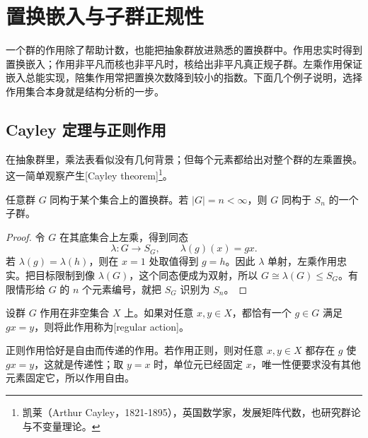 
\section{置换嵌入与子群正规性}
\label{b1:sec:0404}

一个群的作用除了帮助计数，也能把抽象群放进熟悉的置换群中。作用忠实时得到置换嵌入；作用非平凡而核也非平凡时，核给出非平凡真正规子群。左乘作用保证嵌入总能实现，陪集作用常把置换次数降到较小的指数。下面几个例子说明，选择作用集合本身就是结构分析的一步。


%
%
%

\subsection{Cayley 定理与正则作用}
\label{b1:subsec:0404:01}

在抽象群里，乘法表看似没有几何背景；但每个元素都给出对整个群的左乘置换。这一简单观察产生[Cayley theorem]\footnote{凯莱（Arthur Cayley，1821-1895），英国数学家，发展矩阵代数，也研究群论与不变量理论。}。

\begin{theorem}[Cayley]\label{b1:thm:cayley}
	任意群 \(G\) 同构于某个集合上的置换群。若 \(|G|=n<\infty\)，则 \(G\) 同构于 \(S_n\) 的一个子群。
\end{theorem}
\begin{proof}
	令 \(G\) 在其底集合上左乘，得到同态
	\[
		\lambda:G\longrightarrow S_G,\qquad \lambda(g)(x)=gx.
	\]
	若 \(\lambda(g)=\lambda(h)\)，则在 \(x=1\) 处取值得到 \(g=h\)。因此 \(\lambda\) 单射，左乘作用忠实。把目标限制到像 \(\lambda(G)\)，这个同态便成为双射，所以 \(G\cong\lambda(G)\leq S_G\)。有限情形给 \(G\) 的 \(n\) 个元素编号，就把 \(S_G\) 识别为 \(S_n\)。
\end{proof}

\begin{definition}\label{b1:def:regular-action}
	设群 \(G\) 作用在非空集合 \(X\) 上。如果对任意 \(x,y\in X\)，都恰有一个 \(g\in G\) 满足 \(gx=y\)，则将此作用称为[regular action]。
\end{definition}

正则作用恰好是自由而传递的作用。若作用正则，则对任意 \(x,y\in X\) 都存在 \(g\) 使 \(gx=y\)，这就是传递性；取 \(y=x\) 时，单位元已经固定 \(x\)，唯一性便要求没有其他元素固定它，所以作用自由。

